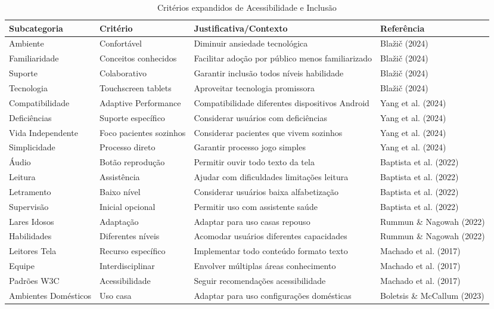 \begin{table}[H]
\begin{table}[H]
\centering
\caption{Critérios expandidos de Acessibilidade e Inclusão}
\label{tab:acessibilidade_expandida}
\begin{tabular}{p{2.5cm}p{3.5cm}p{4.5cm}p{2.5cm}}
\hline
\textbf{Subcategoria} & \textbf{Critério} & \textbf{Justificativa/Contexto} & \textbf{Referência} \\ \hline
Ambiente & Confortável & Diminuir ansiedade tecnológica & Blažič (2024) \\
Familiaridade & Conceitos conhecidos & Facilitar adoção por público menos familiarizado & Blažič (2024) \\
Suporte & Colaborativo & Garantir inclusão todos níveis habilidade & Blažič (2024) \\
Tecnologia & Touchscreen tablets & Aproveitar tecnologia promissora & Blažič (2024) \\
Compatibilidade & Adaptive Performance & Compatibilidade diferentes dispositivos Android & Yang et al. (2024) \\
Deficiências & Suporte específico & Considerar usuários com deficiências & Yang et al. (2024) \\
Vida Independente & Foco pacientes sozinhos & Considerar pacientes que vivem sozinhos & Yang et al. (2024) \\
Simplicidade & Processo direto & Garantir processo jogo simples & Yang et al. (2024) \\
Áudio & Botão reprodução & Permitir ouvir todo texto da tela & Baptista et al. (2022) \\
Leitura & Assistência & Ajudar com dificuldades limitações leitura & Baptista et al. (2022) \\
Letramento & Baixo nível & Considerar usuários baixa alfabetização & Baptista et al. (2022) \\
Supervisão & Inicial opcional & Permitir uso com assistente saúde & Baptista et al. (2022) \\
Lares Idosos & Adaptação & Adaptar para uso casas repouso & Rummun \& Nagowah (2022) \\
Habilidades & Diferentes níveis & Acomodar usuários diferentes capacidades & Rummun \& Nagowah (2022) \\
Leitores Tela & Recurso específico & Implementar todo conteúdo formato texto & Machado et al. (2017) \\
Equipe & Interdisciplinar & Envolver múltiplas áreas conhecimento & Machado et al. (2017) \\
Padrões W3C & Acessibilidade & Seguir recomendações acessibilidade & Machado et al. (2017) \\
Ambientes Domésticos & Uso casa & Adaptar para uso configurações domésticas & Boletsis \& McCallum (2023) \\
\hline
\end{tabular}
\end{table}


\end{table}
